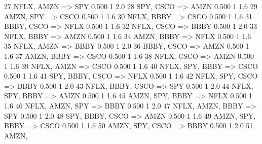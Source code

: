 \documentclass{article}
\begin{document}
\begin{Schunk}
\begin{Soutput}
27 {NFLX,                                  
    AMZN} => {SPY}    0.500          1  2.0
28 {SPY,                                   
    CSCO} => {AMZN}   0.500          1  1.6
29 {AMZN,                                  
    SPY}  => {CSCO}   0.500          1  1.6
30 {NFLX,                                  
    BBBY} => {CSCO}   0.500          1  1.6
31 {BBBY,                                  
    CSCO} => {NFLX}   0.500          1  1.6
32 {NFLX,                                  
    CSCO} => {BBBY}   0.500          1  2.0
33 {NFLX,                                  
    BBBY} => {AMZN}   0.500          1  1.6
34 {AMZN,                                  
    BBBY} => {NFLX}   0.500          1  1.6
35 {NFLX,                                  
    AMZN} => {BBBY}   0.500          1  2.0
36 {BBBY,                                  
    CSCO} => {AMZN}   0.500          1  1.6
37 {AMZN,                                  
    BBBY} => {CSCO}   0.500          1  1.6
38 {NFLX,                                  
    CSCO} => {AMZN}   0.500          1  1.6
39 {NFLX,                                  
    AMZN} => {CSCO}   0.500          1  1.6
40 {NFLX,                                  
    SPY,                                   
    BBBY} => {CSCO}   0.500          1  1.6
41 {SPY,                                   
    BBBY,                                  
    CSCO} => {NFLX}   0.500          1  1.6
42 {NFLX,                                  
    SPY,                                   
    CSCO} => {BBBY}   0.500          1  2.0
43 {NFLX,                                  
    BBBY,                                  
    CSCO} => {SPY}    0.500          1  2.0
44 {NFLX,                                  
    SPY,                                   
    BBBY} => {AMZN}   0.500          1  1.6
45 {AMZN,                                  
    SPY,                                   
    BBBY} => {NFLX}   0.500          1  1.6
46 {NFLX,                                  
    AMZN,                                  
    SPY}  => {BBBY}   0.500          1  2.0
47 {NFLX,                                  
    AMZN,                                  
    BBBY} => {SPY}    0.500          1  2.0
48 {SPY,                                   
    BBBY,                                  
    CSCO} => {AMZN}   0.500          1  1.6
49 {AMZN,                                  
    SPY,                                   
    BBBY} => {CSCO}   0.500          1  1.6
50 {AMZN,                                  
    SPY,                                   
    CSCO} => {BBBY}   0.500          1  2.0
51 {AMZN,                                  
}
\end{Soutput}
\end{Schunk}
\end{document}

